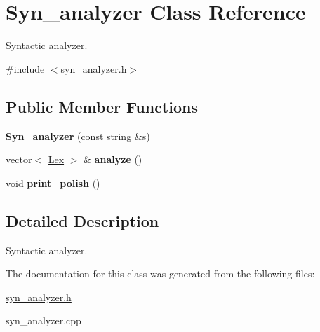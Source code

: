 \hypertarget{class_syn__analyzer}{}\section{Syn\+\_\+analyzer Class Reference}
\label{class_syn__analyzer}


Syntactic analyzer.  




{\ttfamily \#include $<$syn\+\_\+analyzer.\+h$>$}

\subsection*{Public Member Functions}
\begin{DoxyCompactItemize}
\item 
{\bfseries Syn\+\_\+analyzer} (const string \&s)\hypertarget{class_syn__analyzer_a4ddc33fce8676f980e87666fdabac9bb}{}\label{class_syn__analyzer_a4ddc33fce8676f980e87666fdabac9bb}

\item 
vector$<$ \hyperlink{class_lex}{Lex} $>$ \& {\bfseries analyze} ()\hypertarget{class_syn__analyzer_a528cb566193d515343fa97fec7334b21}{}\label{class_syn__analyzer_a528cb566193d515343fa97fec7334b21}

\item 
void {\bfseries print\+\_\+polish} ()\hypertarget{class_syn__analyzer_a74e1d1170039aa2a93ee3f72c4a0134e}{}\label{class_syn__analyzer_a74e1d1170039aa2a93ee3f72c4a0134e}

\end{DoxyCompactItemize}


\subsection{Detailed Description}
Syntactic analyzer. 

The documentation for this class was generated from the following files\+:\begin{DoxyCompactItemize}
\item 
\hyperlink{syn__analyzer_8h}{syn\+\_\+analyzer.\+h}\item 
syn\+\_\+analyzer.\+cpp\end{DoxyCompactItemize}
